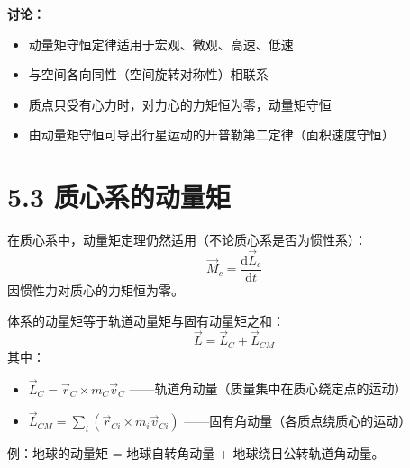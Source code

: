 \documentclass{ctexart}
\begin{document}
\textbf{讨论：}
\begin{itemize}
  \item 动量矩守恒定律适用于宏观、微观、高速、低速
  \item 与空间各向同性（空间旋转对称性）相联系
  \item 质点只受有心力时，对力心的力矩恒为零，动量矩守恒
  \item 由动量矩守恒可导出行星运动的开普勒第二定律（面积速度守恒）
\end{itemize}

\section*{5.3 质心系的动量矩}

在质心系中，动量矩定理仍然适用（不论质心系是否为惯性系）：
\[
\vec{M}_c = \frac{\mathrm{d}\vec{L}_c}{\mathrm{d}t}
\]
因惯性力对质心的力矩恒为零。

体系的动量矩等于轨道动量矩与固有动量矩之和：
\[
\vec{L} = \vec{L}_C + \vec{L}_{CM}
\]
其中：
\begin{itemize}
  \item $\vec{L}_C = \vec{r}_C \times m_C \vec{v}_C$ ——轨道角动量（质量集中在质心绕定点的运动）
  \item $\vec{L}_{CM} = \sum_i (\vec{r}_{Ci} \times m_i \vec{v}_{Ci})$ ——固有角动量（各质点绕质心的运动）
\end{itemize}

例：地球的动量矩 = 地球自转角动量 + 地球绕日公转轨道角动量。
\end{document}
